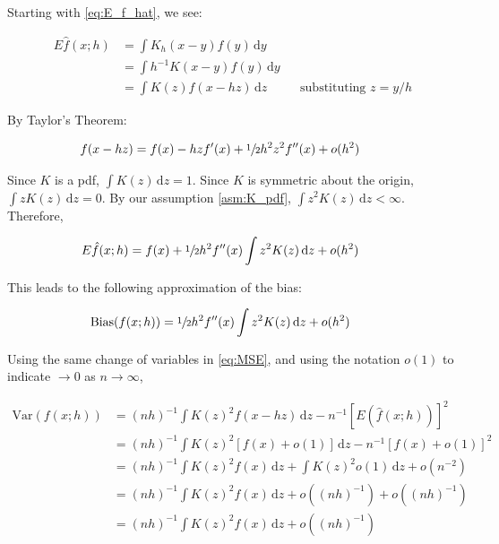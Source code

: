 Starting with \autoref{eq:E_f_hat}, we see:

\begin{align}
E\hat{f}(x;h) & = \int{K_h(x - y)f(y)\,\mathrm{d}y} && \nonumber \\
    & = \int{h^{-1}K(x-y)f(y)\,\mathrm{d}y} && \nonumber \\
    & = \int{K(z)f(x-hz)\,\mathrm{d}z} && \text{substituting } z=y/h
\end{align}

By Taylor's Theorem:

\begin{align}
f(x-hz) & = f(x) - hzf^\prime(x) + \sfrac{1}{2}h^2z^2f^{\prime\prime}(x) + o(h^2) && \nonumber
\end{align}

Since $K$ is a pdf, $\int{K(z)\,\mathrm{d}z}=1$.
Since $K$ is symmetric about the origin, $\int{zK(z)\,\mathrm{d}z}=0$.
By our assumption \ref{asm:K_pdf}, $\int{z^2K(z)\,\mathrm{d}z} < \infty$.
Therefore,

\begin{align}
E\hat{f}(x;h) & = f(x) + \sfrac{1}{2}h^2f^{\prime\prime}(x)\int{z^2K(z)\,\mathrm{d}z} + o(h^2) && \nonumber
\end{align}

This leads to the following approximation of the bias:

\begin{align}
\mbox{Bias}(f(x;h)) & = \sfrac{1}{2}h^2f^{\prime\prime}(x)\int{z^2K(z)\,\mathrm{d}z} + o(h^2) && \label{eq:ABias}
\end{align}

Using the same change of variables in \autoref{eq:MSE}, and using the notation $o(1)$ to indicate $\to 0$ as $n \to \infty$,

\begin{align}
\mbox{Var}(f(x;h)) & = (nh)^{-1} \int{K(z)^2f(x - hz)\,\mathrm{d}z} - n^{-1} [E(\hat{f}(x;h))]^2 && \nonumber \\
    & = (nh)^{-1} \int{K(z)^2[f(x) + o(1)]\,\mathrm{d}z} - n^{-1}[f(x) + o(1)]^2 && \nonumber \\
    & = (nh)^{-1} \int{K(z)^2f(x)\,\mathrm{d}z} + \int{K(z)^2o(1)\,\mathrm{d}z} + o(n^{-2})  && \nonumber \\
    & = (nh)^{-1} \int{K(z)^2f(x)\,\mathrm{d}z} + o((nh)^{-1}) + o((nh)^{-1}) && \nonumber \\
    & = (nh)^{-1} \int{K(z)^2f(x)\,\mathrm{d}z} + o((nh)^{-1}) && \label{eq:AVar}
\end{align}

